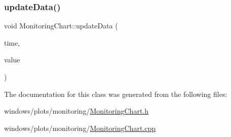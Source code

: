 \subsubsection{\texorpdfstring{update\+Data()}{updateData()}}
{\footnotesize\ttfamily void Monitoring\+Chart\+::update\+Data (\begin{DoxyParamCaption}\item[{const Q\+Date\+Time \&}]{time,  }\item[{int}]{value }\end{DoxyParamCaption})}



The documentation for this class was generated from the following files\+:\begin{DoxyCompactItemize}
\item 
windows/plots/monitoring/\hyperlink{_monitoring_chart_8h}{Monitoring\+Chart.\+h}\item 
windows/plots/monitoring/\hyperlink{_monitoring_chart_8cpp}{Monitoring\+Chart.\+cpp}\end{DoxyCompactItemize}
